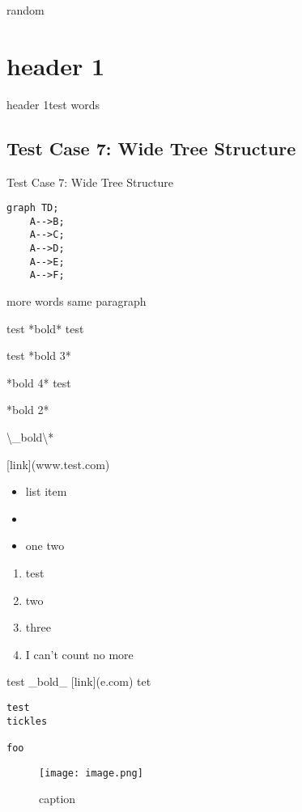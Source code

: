 \documentclass{article}
\begin{document}
random

\section{header 1}
header 1test words

\subsection{Test Case 7: Wide Tree Structure}
Test Case 7: Wide Tree Structure
\begin{verbatim}
graph TD;
    A-->B;
    A-->C;
    A-->D;
    A-->E;
    A-->F;
\end{verbatim}
more words same paragraph

test *bold* test

test *bold 3*

*bold 4* test

*bold 2*

\textbackslash{}_bold\textbackslash{}*

[link](www.test.com)

\begin{itemize}
\item list item
\item 
\item one two
\end{itemize}
\begin{enumerate}
\item test
\item two
\item three
\item I can't count no more
\end{enumerate}
test _bold_ [link](e.com) tet


\begin{verbatim}
test
tickles

foo
\end{verbatim}
\begin{figure}[h]\centering\texttt{[image: image.png]}\caption{caption}\end{figure}
\end{document}
